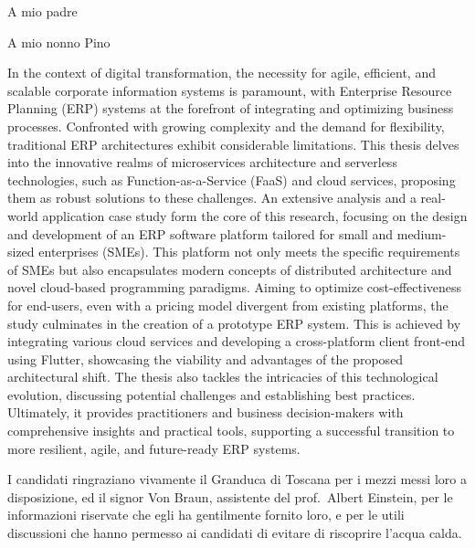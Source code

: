 \documentclass[%
	corpo=11pt,
    twoside,
    stile=classica,
    oldstyle,
    tipotesi=custom,
    greek,
    evenboxes,
]{toptesi}
\begin{document}
\english


\ifclassica%
\begin{dedica}
    A mio padre

    A mio nonno Pino
\end{dedica}

\sommario%
In the context of digital transformation, the necessity for agile, efficient, and scalable corporate information systems is paramount, with Enterprise Resource Planning (ERP) systems at the forefront of integrating and optimizing business processes. Confronted with growing complexity and the demand for flexibility, traditional ERP architectures exhibit considerable limitations. This thesis delves into the innovative realms of microservices architecture and serverless technologies, such as Function-as-a-Service (FaaS) and cloud services, proposing them as robust solutions to these challenges. An extensive analysis and a real-world application case study form the core of this research, focusing on the design and development of an ERP software platform tailored for small and medium-sized enterprises (SMEs). This platform not only meets the specific requirements of SMEs but also encapsulates modern concepts of distributed architecture and novel cloud-based programming paradigms. Aiming to optimize cost-effectiveness for end-users, even with a pricing model divergent from existing platforms, the study culminates in the creation of a prototype ERP system. This is achieved by integrating various cloud services and developing a cross-platform client front-end using Flutter, showcasing the viability and advantages of the proposed architectural shift. The thesis also tackles the intricacies of this technological evolution, discussing potential challenges and establishing best practices. Ultimately, it provides practitioners and business decision-makers with comprehensive insights and practical tools, supporting a successful transition to more resilient, agile, and future-ready ERP systems.


\ringraziamenti%
I candidati ringraziano vivamente il Granduca di Toscana per i mezzi messi loro a disposizione, ed il signor Von Braun, assistente del prof.~Albert Einstein, per le informazioni riservate che egli ha gentilmente fornito loro, e per le utili discussioni che hanno permesso ai candidati di evitare di riscoprire l'acqua calda.
\end{document}
